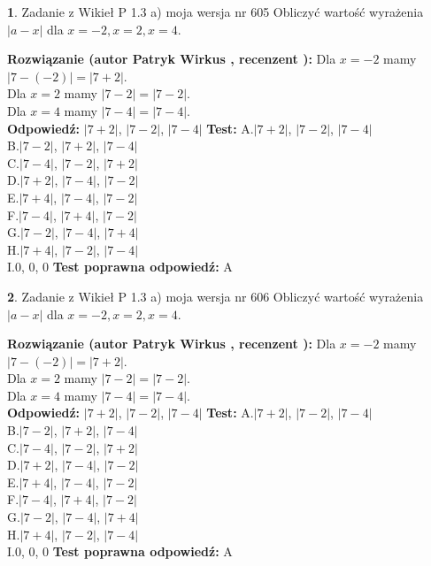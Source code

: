 \documentclass[12pt, a4paper]{article}
\theoremstyle{definition} %
\newtheorem{zad}{}
\newcommand{\zadStart}[1]{\begin{zad}#1\newline}
\newcommand{\zadStop}{\end{zad}}
\newcommand{\rozwStart}[2]{\noindent \textbf{Rozwiązanie (autor #1 , recenzent #2): }\newline}
\newcommand{\rozwStop}{\newline}
\newcommand{\odpStart}{\noindent \textbf{Odpowiedź:}\newline}
\newcommand{\odpStop}{\newline}
\newcommand{\testStart}{\noindent \textbf{Test:}\newline}
\newcommand{\testStop}{\newline}
\newcommand{\kluczStart}{\noindent \textbf{Test poprawna odpowiedź:}\newline}
\newcommand{\kluczStop}{\newline}
\begin{document}
\zadStart{Zadanie z Wikieł P 1.3 a) moja wersja nr 605}
Obliczyć wartość wyrażenia $|a - x|$ dla $x=-2,x=2,x=4$.
\zadStop
\rozwStart{Patryk Wirkus}{}
Dla $x = -2$ mamy $|7 - (-2)| = |7 + 2|$.\\
Dla $x = 2$ mamy $|7 - 2| = |7 - 2|$.\\
Dla $x = 4$ mamy $|7 - 4| = |7 - 4|$.\\
\rozwStop
\odpStart
$|7 + 2|$, $|7 - 2|$, $|7 - 4|$
\odpStop
\testStart
A.$|7 + 2|$, $|7 - 2|$, $|7 - 4|$\\
B.$|7 - 2|$, $|7 + 2|$, $|7 - 4|$\\
C.$|7 - 4|$, $|7 - 2|$, $|7 + 2|$\\
D.$|7 + 2|$, $|7 - 4|$, $|7 - 2|$\\
E.$|7 + 4|$, $|7 - 4|$, $|7 - 2|$\\
F.$|7 - 4|$, $|7 + 4|$, $|7 - 2|$\\
G.$|7 - 2|$, $|7 - 4|$, $|7 + 4|$\\
H.$|7 + 4|$, $|7 - 2|$, $|7 - 4|$\\
I.$0$, $0$, $0$
\testStop
\kluczStart
A
\kluczStop



\zadStart{Zadanie z Wikieł P 1.3 a) moja wersja nr 606}
Obliczyć wartość wyrażenia $|a - x|$ dla $x=-2,x=2,x=4$.
\zadStop
\rozwStart{Patryk Wirkus}{}
Dla $x = -2$ mamy $|7 - (-2)| = |7 + 2|$.\\
Dla $x = 2$ mamy $|7 - 2| = |7 - 2|$.\\
Dla $x = 4$ mamy $|7 - 4| = |7 - 4|$.\\
\rozwStop
\odpStart
$|7 + 2|$, $|7 - 2|$, $|7 - 4|$
\odpStop
\testStart
A.$|7 + 2|$, $|7 - 2|$, $|7 - 4|$\\
B.$|7 - 2|$, $|7 + 2|$, $|7 - 4|$\\
C.$|7 - 4|$, $|7 - 2|$, $|7 + 2|$\\
D.$|7 + 2|$, $|7 - 4|$, $|7 - 2|$\\
E.$|7 + 4|$, $|7 - 4|$, $|7 - 2|$\\
F.$|7 - 4|$, $|7 + 4|$, $|7 - 2|$\\
G.$|7 - 2|$, $|7 - 4|$, $|7 + 4|$\\
H.$|7 + 4|$, $|7 - 2|$, $|7 - 4|$\\
I.$0$, $0$, $0$
\testStop
\kluczStart
A
\kluczStop
\end{document}
